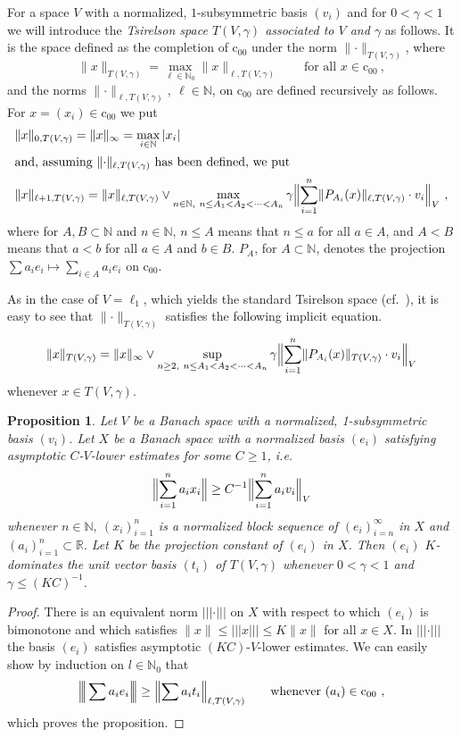 \documentclass[11pt,leqno]{amsart}
\newtheorem{prop}[thm]{Proposition}
\theoremstyle{definition}
\newcommand{\N}{\mathbb{N}}
\newcommand{\R}{\mathbb{R}}
\def\trivert#1{|\!|\!| #1|\!|\!|}
\def\Btrivert#1{\Big|\!\Big|\!\Big| #1\Big|\!\Big|\!\Big|}
\newcommand{\coo}{\mathrm{c}_{00}}
\newcommand{\norm}[1]{\lVert#1\rVert}
\newcommand{\Bignorm}[1]{\Bigl\lVert#1\Bigr\rVert}
\begin{document}
For a space $V$ with a normalized, $1$-subsymmetric basis $(v_i)$ and
for $0<\gamma<1$ we will introduce the {\em Tsirelson space
  $T(V,\gamma)$ associated to $V$ and $\gamma$} as follows. It is the
space defined as the completion of $\coo$ under the norm
$\norm{\cdot}_{T(V,\gamma)}$, where
$$\norm{x}_{T(V,\gamma)}=\max_{\ell\in\N_0}\norm{x}_{\ell,T(V,\gamma)}
\qquad\text{for all }x\in \coo\ ,$$
and the norms $\norm{\cdot}_{\ell,T(V,\gamma)},\ \ell\in\N$, on $\coo$
are defined recursively as follows. For $x=(x_i)\in\coo$ we put
\begin{align*}
  &\norm{x}_{0, T(V,\gamma)}=\norm{x}_\infty=\max_{i\in\N}|x_i|\\
  \intertext{and, assuming $\norm{\cdot}_{\ell, T(V,\gamma)}$ has been
    defined, we put}
  &\norm{x}_{\ell+1, T(V,\gamma)}=\norm{x}_{\ell, T(V,\gamma)}\vee
  \max_{n\in\N,\ n\leq A_1<A_2<\dots<A_n} \gamma\Bignorm{\sum_{i=1}^n
    \norm{P_{A_i}(x)}_{\ell, T(V,\gamma)}\cdot v_i}_V\ ,
\end{align*}
where for $A,B\subset \N$ and $n\in\N$, $n\leq A$ means that $n\leq a$
for all $a\in A$, and $A<B$ means that $a<b$ for all $a\in A$ and
$b\in B$. $P_A$, for $A\subset \N$, denotes the projection
$\sum a_i e_i\mapsto \sum_{i\in A} a_i e_i$ on $\coo$.

As in the case of $V=\ell_1$, which yields the standard Tsirelson
space (cf.~\cite{CS}), it is easy to see that
$\norm{\cdot}_{T(V,\gamma)}$ satisfies the following implicit
equation.
\begin{equation}\label{E:4.1}
  \norm{x}_{T(V,\gamma)}=\norm{x}_\infty\vee \sup_{n\ge2,\ n\le
    A_1<A_2<\dots<A_n} \gamma \Bignorm{\sum_{i=1}^n
    \norm{P_{A_i}(x)}_{T(V,\gamma)}\cdot v_i}_V
\end{equation}
whenever $x\in T(V,\gamma)$.
\begin{prop}
  \label{P:4.3}
  Let $V$ be a Banach space with a normalized, 1-subsymmetric basis
  $(v_i)$. Let $X$ be a Banach space with a normalized basis $(e_i)$
  satisfying asymptotic $C$-$V$-lower estimates for some $C\geq 1$,
  i.e.
  \begin{equation}\label{E:4.3.1}
    \Bignorm{\sum_{i=1}^n a_i x_i}\geq C^{-1}\Bignorm{\sum_{i=1}^n
      a_iv_i}_V
  \end{equation}
  whenever $n\in\N,\ (x_i)_{i=1}^n$ is a normalized block sequence of
  $(e_i)_{i=n}^\infty$ in $X$ and $(a_i)_{i=1}^n\subset \R.$ Let $K$
  be the projection constant of $(e_i)$ in $X$. Then $(e_i)$
  $K$-dominates the unit vector basis $(t_i)$ of $T(V,\gamma)$
  whenever $0<\gamma<1$ and $\gamma\leq (KC)^{-1}$.
\end{prop}
\begin{proof} There is an equivalent norm $\trivert{\cdot}$ on $X$
  with respect to which $(e_i)$ is bimonotone and which satisfies
  $\norm{x}\leq\trivert{x}\leq K\norm{x}$ for all $x\in X$. In
  $\trivert{\cdot}$ the basis $(e_i)$ satisfies asymptotic
  $(KC)$-$V$-lower estimates. We can easily show by induction on
  $l\in\N_0$ that
  $$\Btrivert{\sum a_i e_i}\geq\Bignorm{\sum a_i
    t_i}_{\ell,T(V,\gamma)}\qquad\text{whenever } (a_i)\in\coo\ ,$$
  which proves the proposition.
\end{proof}
\end{document}
